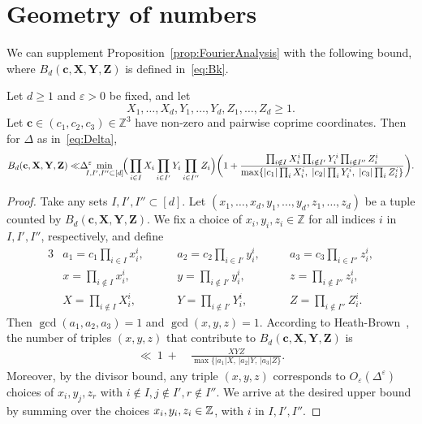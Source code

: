 \section{Geometry of numbers}\label{s:geom}


We can supplement Proposition~\ref{prop:FourierAnalysis} with the following bound,
where $B_d(\mathbf{c},\mathbf{X},\mathbf{Y},\mathbf{Z})$ is defined in~\eqref{eq:Bk}.

\begin{proposition}\label{prop:GeometryofNumbers}
  Let $d\geq 1$ and $\varepsilon>0$ be fixed, and let
  \[
  X_1,\ldots, X_d, Y_1,\ldots, Y_d,Z_1,\ldots, Z_d\geq 1.
  \]
  Let $\mathbf{c}\in (c_1,c_2,c_3)\in \mathbb{Z}^3$ have non-zero and pairwise coprime coordinates.
  Then for $\Delta$ as in~\eqref{eq:Delta},
  \[
  B_d(\mathbf{c},\mathbf{X},\mathbf{Y},\mathbf{Z})
  \ll
  \hspace{-0.1cm} \Delta^{\varepsilon}
  \hspace{-0.3cm}
  \min_{I,I',I''\subset[d]}
  \hspace{-0.1cm}
  \Big(\prod_{i\in I}X_i\prod_{i\in I'}Y_i\prod_{i\in I''}Z_i\Big)\bigg(1 +
  \frac{\prod_{i\notin I}X_i^i\prod_{i\notin I'}Y_i^i\prod_{i\notin I''}Z_i^i}
  {\max\{|c_1|\prod_{i}X_i^i,\;|c_2|\prod_{i}Y_i^i,\;|c_3|\prod_{i}Z_i^i\}}\bigg).
  \]
\end{proposition}
\begin{proof}
  Take any sets $I,I',I''\subset[d]$. Let $(x_1,\ldots, x_d,y_1,\ldots, y_d,z_1,\ldots, z_d)$ be a tuple counted by $B_d(\mathbf{c},\mathbf{X},\mathbf{Y},\mathbf{Z})$. We fix a choice of
  $
  x_i,y_i,z_i \in \mathbb{Z}
  $ for all indices $i$ in $I,I',I''$, respectively, and define
  \begin{alignat*}{3}
  &a_1=c_1\prod_{i\in I}x_i^i, \quad
  &&a_2=c_2\prod_{i\in I'}y_i^i, \quad
  &&a_3=c_3\prod_{i\in I''}z_i^i,\\
  &x=\prod_{i\notin I}x_i^i, \qquad
  &&y=\prod_{i\notin I'}y_i^i, \qquad
  &&z=\prod_{i\notin I''}z_i^i,\\
  &X=\prod_{i\notin I}X_i^i, \qquad
  &&Y=\prod_{i\notin I'}Y_i^i, \qquad
  &&Z=\prod_{i\notin I''}Z_i^i.
  \end{alignat*}
  Then $\gcd(a_1,a_2,a_3)=1$ and $\gcd(x,y,z)=1$. According to Heath-Brown~\cite[Lemma 3]{h-b84}, the number of triples $(x,y,z)$ that contribute to $B_d(\mathbf{c},\mathbf{X},\mathbf{Y},\mathbf{Z})$ is
  \begin{align*}
  \ll \ 1 \ + \ &
  \frac{XYZ}{\max\big\{|a_1|X,\,|a_2|Y,\,|a_3|Z\big\}}.
  \end{align*}
  Moreover, by the divisor bound, any triple $(x,y,z)$ corresponds to $O_{\varepsilon}(\Delta^{\varepsilon})$ choices of $x_i,y_j,z_r$ with $i\not \in I, j\not \in I', r\not \in I''$.
  We arrive at the
  desired upper bound by
  summing over the choices $x_i,y_i,z_i\in\mathbb{Z}$, with $i$ in $I,I',I''$.
\end{proof}

